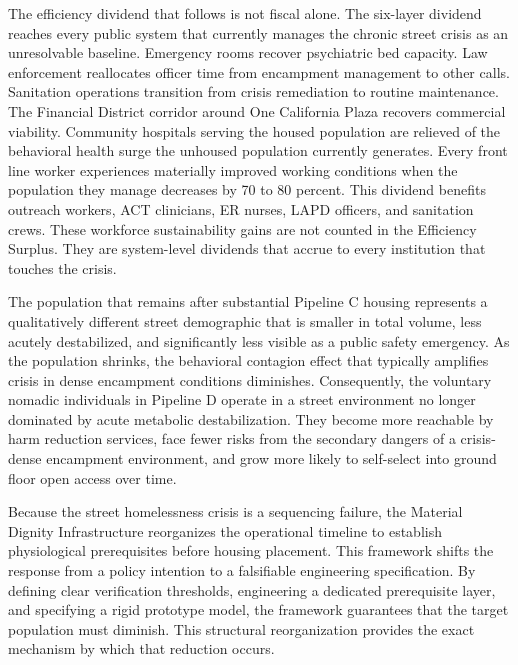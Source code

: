 \documentclass[12pt, letterpaper]{article}
\begin{document}
The efficiency dividend that follows is not fiscal alone. The six-layer dividend reaches every public system that currently manages the chronic street crisis as an unresolvable baseline. Emergency rooms recover psychiatric bed capacity. Law enforcement reallocates officer time from encampment management to other calls. Sanitation operations transition from crisis remediation to routine maintenance. The Financial District corridor around One California Plaza recovers commercial viability. Community hospitals serving the housed population are relieved of the behavioral health surge the unhoused population currently generates. Every front line worker experiences materially improved working conditions when the population they manage decreases by 70 to 80 percent. This dividend benefits outreach workers, ACT clinicians, ER nurses, LAPD officers, and sanitation crews. These workforce sustainability gains are not counted in the Efficiency Surplus. They are system-level dividends that accrue to every institution that touches the crisis.

The population that remains after substantial Pipeline C housing represents a qualitatively different street demographic that is smaller in total volume, less acutely destabilized, and significantly less visible as a public safety emergency. As the population shrinks, the behavioral contagion effect that typically amplifies crisis in dense encampment conditions diminishes. Consequently, the voluntary nomadic individuals in Pipeline D operate in a street environment no longer dominated by acute metabolic destabilization. They become more reachable by harm reduction services, face fewer risks from the secondary dangers of a crisis-dense encampment environment, and grow more likely to self-select into ground floor open access over time.

Because the street homelessness crisis is a sequencing failure, the Material Dignity Infrastructure reorganizes the operational timeline to establish physiological prerequisites before housing placement. This framework shifts the response from a policy intention to a falsifiable engineering specification. By defining clear verification thresholds, engineering a dedicated prerequisite layer, and specifying a rigid prototype model, the framework guarantees that the target population must diminish. This structural reorganization provides the exact mechanism by which that reduction occurs.

\clearpage
\raggedbottom
\appendix
{}
\let\oldparagraph\paragraph
\renewcommand{\paragraph}[1]{\needspace{3\baselineskip}\oldparagraph{#1}}

\let\paragraph\oldparagraph

\newpage
{}


\end{document}
